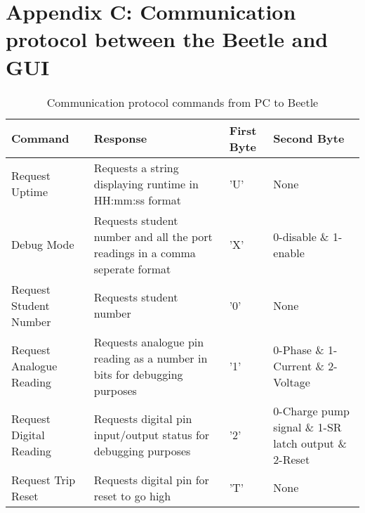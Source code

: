 \chapter{Appendix C: Communication protocol between the Beetle and GUI}

\begin{table} [h!]
        \centering
        \footnotesize
        \caption{Communication protocol commands from PC to Beetle}
         \begin{tabular}{C{4cm} C{4cm} C{2cm} C{4cm}}
           Command & Response & First Byte & Second Byte\\
        \hline
            Request Uptime & Requests a string displaying runtime in HH:mm:ss format & 'U' & None \\
            Debug Mode & Requests student number and all the port readings in a comma seperate format  & 'X' & 0-disable \& 1-enable \\
            Request Student Number & Requests student number & '0' & None \\
            Request Analogue Reading & Requests analogue pin reading as a number in bits for debugging purposes & '1' & 0-Phase \& 1-Current \& 2-Voltage  \\
            Request Digital Reading & Requests digital pin input/output status for debugging purposes & '2' & 0-Charge pump signal \& 1-SR latch output \& 2-Reset  \\
            Request Trip Reset & Requests digital pin for reset to go high & 'T' & None  \\
          \hline
        \end{tabular}
     \label{tab:commsprotocal1}
\end{table}

